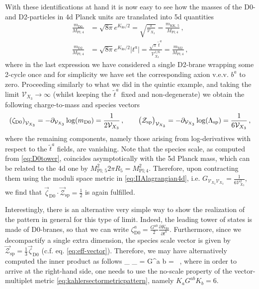 With these identifications at hand it is now easy to see how the masses of the D0- and D2-particles in 4d Planck units are translated into 5d quantities
%
\begin{equation}\label{eq:massesD0D2}
	\begin{aligned}
		\frac{m_{\text{D0}}}{M_{\text{Pl;}\, 4}} & =\sqrt{8\pi } e^{K_{\text{ks}}/2} = \sqrt{\frac{\pi}{\mathcal{V}_{X_3}}} = \frac{m_{\text{KK},\, 5}}{M_{\text{Pl;}\, 4}}\, ,\\
		\frac{m_{\text{D2}}}{M_{\text{Pl;}\, 4}} & =\sqrt{8\pi } e^{K_{\text{ks}}/2} |t^a| = \frac{\sqrt{\pi}\, \tilde t^a}{\mathcal{V}_{X_3}^{1/6}} = \frac{m_{\text{M2}}}{M_{\text{Pl;}\, 4}}\, ,
	\end{aligned}
\end{equation}
%
where in the last expression we have considered a single D2-brane wrapping some 2-cycle once and for simplicity we have set the corresponding axion v.e.v. $b^a$ to zero. Proceeding similarly to what we did in the quintic example, and taking the limit $\mathcal{V}_{X_3} \to \infty$ (whilst keeping the $\tilde t^a$ fixed and non-degenerate) we obtain the following charge-to-mass and species vectors
%
\begin{equation}
	\left(\zeta_{\text{D0}}\right)_{\mathcal{V}_{X_3}} = - \partial_{\mathcal{V}_{X_3}} \log (m_{\text{D0}}) = \frac{1}{2 \mathcal{V}_{X_3}}\, , \qquad
	\left(\mathcal{Z}_{\text{sp}}\right)_{\mathcal{V}_{X_3}} = - \partial_{\mathcal{V}_{X_3}} \log(\Lambda_{\text{sp}}) = \frac{1}{6 \mathcal{V}_{X_3}}\, ,
\end{equation}
%
where the remaining components, namely those arising from log-derivatives with respect to the $\tilde t^a$ fields, are vanishing. Note that the species scale, as computed from \eqref{eq:D0tower}, coincides asymptotically with the 5d Planck mass, which can be related to the 4d one by $M_{\text{Pl};\, 5}^2 2\pi R_5 = M_{\text{Pl;}\, 4}^2$. Therefore, upon contracting them using the moduli space metric in \eqref{eq:IIAlagrangian4d}, i.e. $G_{\mathcal{V}_{X_3}\mathcal{V}_{X_3}}=\frac{1}{6\mathcal{V}_{X_3}^2}$, we find that $\vec{\zeta}_{\text{D0}} \cdot \vec{\mathcal{Z}}_{\text{sp}} = \frac{1}{2}$ is again fulfilled.	
	
Interestingly, there is an alternative very simple way to show the realization of the pattern in general for this type of limit. Indeed, the leading tower of states is made of D0-branes, so that we can write $\zeta_{\text{D0}}^a=\frac{G^{a b}}{2}\frac{\partial K_{\text{ks}}}{\partial t^{b}}$. Furthermore, since we decompactify a single extra dimension, the species scale vector is given by $\vec{\mathcal{Z}}_{\text{sp}}=\frac{1}{3} \vec{\zeta}_{\text{D0}}$ (c.f. eq. \eqref{eq:eff-vector}). Therefore, we may have alternatively computed the inner product as follows
%
\beq 
\label{noscale}
	\vec{\zeta}_{} \cdot {}_{} =   G^{a b}  = \, ,
\eeq
%
where in order to arrive at the right-hand side, one needs to use the no-scale property of the vector-multiplet metric \eqref{eq:kahlersectormetricpattern}, namely $K_a G^{a b} K_b=6$. 		
	
